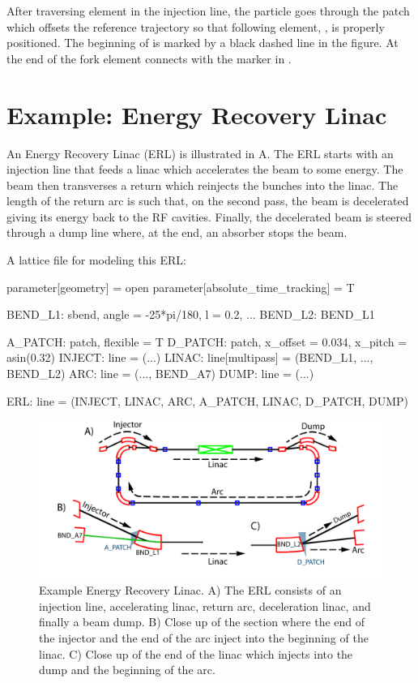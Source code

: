 After traversing element  in the injection line, the particle
goes through the patch  which offsets the reference trajectory
so that following element, , is properly positioned.  The
beginning of  is marked by a black dashed line in the figure.
At the end of  the fork element  connects 
with the marker  in .

\section{Example: Energy Recovery Linac}
\label{s:ex.erl}

An Energy Recovery Linac (ERL) is illustrated in A. The ERL
starts with an injection line that feeds a linac which accelerates the
beam to some energy. The beam then transverses a return  which
reinjects the bunches into the linac. The length of the return arc is
such that, on the second pass, the beam is decelerated giving its
energy back to the RF cavities. Finally, the decelerated beam is
steered through a dump line where, at the end, an absorber stops the
beam.

 A lattice file for modeling this ERL:
\begin{example}
  parameter[geometry] = open
  parameter[absolute_time_tracking] = T

  BEND_L1: sbend, angle = -25*pi/180, l = 0.2, ...
  BEND_L2: BEND_L1

  A_PATCH: patch, flexible = T
  D_PATCH: patch, x_offset = 0.034, x_pitch = asin(0.32) 
  INJECT: line = (...)
  LINAC: line[multipass] = (BEND_L1, ..., BEND_L2)
  ARC: line = (..., BEND_A7)
  DUMP: line = (...)

  ERL: line = (INJECT, LINAC, ARC, A_PATCH, LINAC, D_PATCH, DUMP)
\end{example}

\begin{figure}[tb]
  \centering
  \includegraphics[width=6in]{erl.pdf}
  \caption[Example Energy Recovery Linac.]{
Example Energy Recovery Linac. A) The ERL consists of an injection line, accelerating linac, return
arc, deceleration linac, and finally a beam dump. B) Close up of the section where the end of the
injector and the end of the arc inject into the beginning of the linac. C) Close up of the end of
the linac which injects into the dump and the beginning of the arc.}
  \label{f:erl}
\end{figure}

